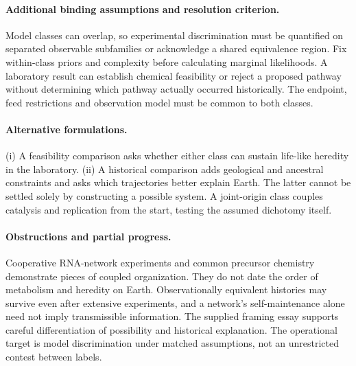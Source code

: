 \documentclass[11pt]{article}
\begin{document}
\paragraph{Additional binding assumptions and resolution criterion.} Model classes can overlap, so experimental discrimination must be quantified on separated observable subfamilies or acknowledge a shared equivalence region. Fix within-class priors and complexity before calculating marginal likelihoods. A laboratory result can establish chemical feasibility or reject a proposed pathway without determining which pathway actually occurred historically. The endpoint, feed restrictions and observation model must be common to both classes.

\paragraph{Alternative formulations.} (i) A feasibility comparison asks whether either class can sustain life-like heredity in the laboratory. (ii) A historical comparison adds geological and ancestral constraints and asks which trajectories better explain Earth. The latter cannot be settled solely by constructing a possible system. A joint-origin class couples catalysis and replication from the start, testing the assumed dichotomy itself.

\paragraph{Obstructions and partial progress.} Cooperative RNA-network experiments and common precursor chemistry demonstrate pieces of coupled organization. They do not date the order of metabolism and heredity on Earth. Observationally equivalent histories may survive even after extensive experiments, and a network's self-maintenance alone need not imply transmissible information. The supplied framing essay supports careful differentiation of possibility and historical explanation. The operational target is model discrimination under matched assumptions, not an unrestricted contest between labels.
\end{document}
